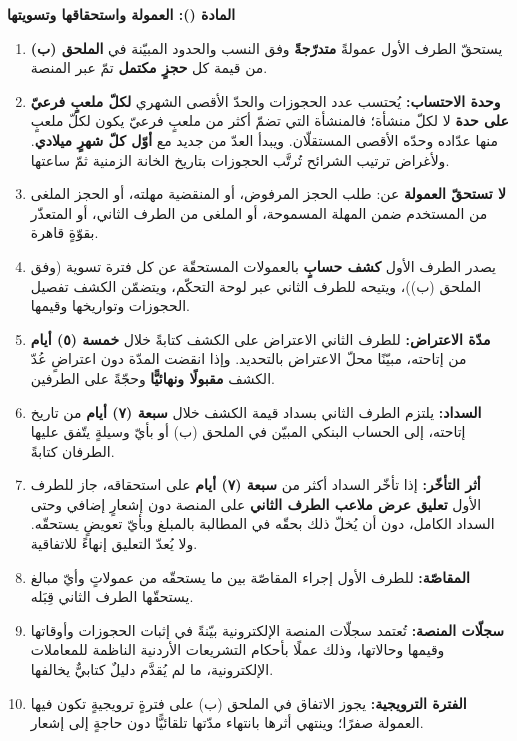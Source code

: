 \documentclass[12pt,a4paper]{article}
\newcounter{bndc}
\newcommand{\bnd}[1]{%
  \vspace{10pt}\par\noindent
  {\color{teal}\bfseries\large المادة (\arabic{bndc}): #1}%
  \stepcounter{bndc}%
  \par\vspace{2pt}\noindent{\color{rule}\rule{\linewidth}{0.6pt}}\par\vspace{4pt}%
}
\newcommand{\mlh}[1]{{\bfseries #1}}
\newenvironment{bnditems}
  {\begin{enumerate}[label=\arabic{bndc}.\arabic*,leftmargin=1.6em,itemsep=3pt,topsep=3pt]}
  {\end{enumerate}}
\begin{document}
\bnd{العمولة واستحقاقها وتسويتها}\label{art:comm}
\begin{bnditems}
  \item يستحقّ الطرف الأول عمولةً \mlh{متدرّجةً} وفق النسب والحدود المبيّنة في \mlh{الملحق (ب)} من قيمة كل \mlh{حجزٍ مكتمل} تمّ عبر المنصة.
  \item \mlh{وحدة الاحتساب:} يُحتسب عدد الحجوزات والحدّ الأقصى الشهري \mlh{لكلّ ملعبٍ فرعيّ على حدة} لا لكلّ منشأة؛ فالمنشأة التي تضمّ أكثر من ملعبٍ فرعيّ يكون لكلّ ملعبٍ منها عدّاده وحدّه الأقصى المستقلّان. ويبدأ العدّ من جديد مع \mlh{أوّل كلّ شهرٍ ميلادي}. ولأغراض ترتيب الشرائح تُرتَّب الحجوزات بتاريخ الخانة الزمنية ثمّ ساعتها.
  \item \mlh{لا تستحقّ العمولة} عن: طلب الحجز المرفوض، أو المنقضية مهلته، أو الحجز الملغى من المستخدم ضمن المهلة المسموحة، أو الملغى من الطرف الثاني، أو المتعذّر بقوّةٍ قاهرة.
  \item يصدر الطرف الأول \mlh{كشف حسابٍ} بالعمولات المستحقّة عن كل فترة تسوية (وفق الملحق (ب))، ويتيحه للطرف الثاني عبر لوحة التحكّم، ويتضمّن الكشف تفصيل الحجوزات وتواريخها وقيمها.
  \item \mlh{مدّة الاعتراض:} للطرف الثاني الاعتراض على الكشف كتابةً خلال \mlh{خمسة (٥) أيام} من إتاحته، مبيّنًا محلّ الاعتراض بالتحديد. وإذا انقضت المدّة دون اعتراضٍ عُدّ الكشف \mlh{مقبولًا ونهائيًّا} وحجّةً على الطرفين.
  \item \mlh{السداد:} يلتزم الطرف الثاني بسداد قيمة الكشف خلال \mlh{سبعة (٧) أيام} من تاريخ إتاحته، إلى الحساب البنكي المبيّن في الملحق (ب) أو بأيّ وسيلةٍ يتّفق عليها الطرفان كتابةً.
  \item \mlh{أثر التأخّر:} إذا تأخّر السداد أكثر من \mlh{سبعة (٧) أيام} على استحقاقه، جاز للطرف الأول \mlh{تعليق عرض ملاعب الطرف الثاني} على المنصة دون إشعارٍ إضافي وحتى السداد الكامل، دون أن يُخلّ ذلك بحقّه في المطالبة بالمبلغ وبأيّ تعويضٍ يستحقّه. ولا يُعدّ التعليق إنهاءً للاتفاقية.
  \item \mlh{المقاصّة:} للطرف الأول إجراء المقاصّة بين ما يستحقّه من عمولاتٍ وأيّ مبالغ يستحقّها الطرف الثاني قِبَله.
  \item \mlh{سجلّات المنصة:} تُعتمد سجلّات المنصة الإلكترونية بيّنةً في إثبات الحجوزات وأوقاتها وقيمها وحالاتها، وذلك عملًا بأحكام التشريعات الأردنية الناظمة للمعاملات الإلكترونية، ما لم يُقدَّم دليلٌ كتابيٌّ يخالفها.
  \item \mlh{الفترة الترويجية:} يجوز الاتفاق في الملحق (ب) على فترةٍ ترويجيةٍ تكون فيها العمولة صفرًا؛ وينتهي أثرها بانتهاء مدّتها تلقائيًّا دون حاجةٍ إلى إشعار.
\end{bnditems}
\end{document}
